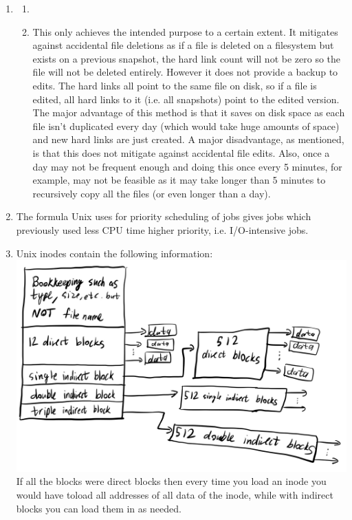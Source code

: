 \documentclass[12pt]{article}
\begin{document}
\begin{enumerate}
\begin{enumerate}
    \end{enumerate}
    \item \begin{enumerate}
        \item 
        \item This only achieves the intended purpose to a certain extent. It mitigates against accidental file deletions as if a file is deleted on a filesystem but exists on a previous snapshot, the hard link count will not be zero so the file will not be deleted entirely. However it does not provide a backup to edits. The hard links all point to the same file on disk, so if a file is edited, all hard links to it (i.e. all snapshots) point to the edited version. The major advantage of this method is that it saves on disk space as each file isn't duplicated every day (which would take huge amounts of space) and new hard links are just created. A major disadvantage, as mentioned, is that this does not mitigate against accidental file edits. Also, once a day may not be frequent enough and doing this once every 5 minutes, for example, may not be feasible as it may take longer than 5 minutes to recursively copy all the files (or even longer than a day).
    \end{enumerate}
    \item The formula Unix uses for priority scheduling of jobs gives jobs which previously used less CPU time higher priority, i.e. I/O-intensive jobs.
    \item Unix inodes contain the following information:\\
    \includegraphics[scale=0.25]{2b.jpg}\\
    If all the blocks were direct blocks then every time you load an inode you would have toload all addresses of all data of the inode, while with indirect blocks you can load them in as needed.

\end{enumerate}
\end{document}
